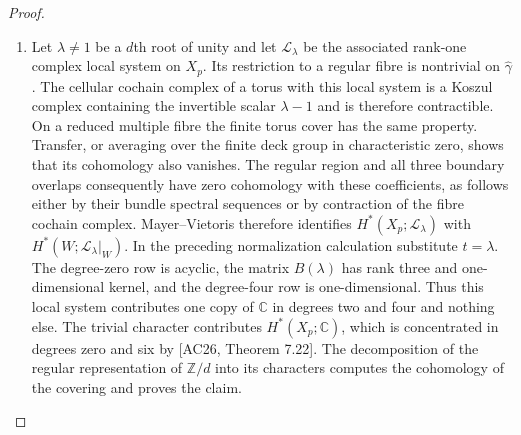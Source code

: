 \begin{proof}
\begin{enumerate}[label=\arabic*.,leftmargin=*]
\item Let $\lambda\ne1$ be a $d$th root of unity and let
$\mathcal L_\lambda$ be the associated rank-one complex local system
on $X_p$. Its restriction to a regular fibre is nontrivial on
$\widehat\gamma$. The cellular cochain complex of a torus with this
local system is a Koszul complex containing the invertible scalar
$\lambda-1$ and is therefore contractible. On a reduced multiple
fibre the finite torus cover has the same property. Transfer, or
averaging over the finite deck group in characteristic zero, shows
that its cohomology also vanishes. The regular region and all three
boundary overlaps consequently have zero cohomology with these
coefficients, as follows either by their bundle spectral sequences
or by contraction of the fibre cochain complex. Mayer--Vietoris
therefore identifies $H^*(X_p;\mathcal L_\lambda)$ with
$H^*(W;\mathcal L_\lambda|_W)$.
In the preceding normalization calculation substitute $t=\lambda$.
The degree-zero row is acyclic, the matrix $B(\lambda)$ has rank three
and one-dimensional kernel, and the degree-four row is one-dimensional.
Thus this local system contributes one copy of $\mathbb C$ in degrees
two and four and nothing else. The trivial character contributes
$H^*(X_p;\mathbb C)$, which is concentrated in degrees zero and six by
\textup{[AC26, Theorem 7.22]}. The decomposition of the regular
representation of $\mathbb Z/d$ into its characters computes the
cohomology of the covering and proves the claim.
\end{enumerate}
\end{proof}

